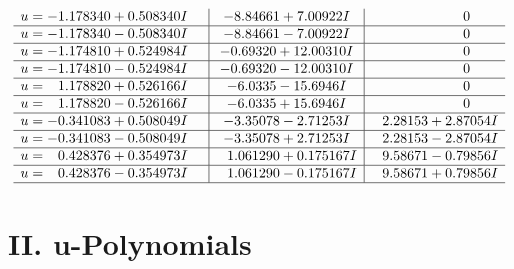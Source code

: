 \documentclass[1p]{elsarticle_modified}
\theoremstyle{definition}
\begin{document}
$$\begin{array}{c|c|c}
\begin{aligned}
u &= -1.178340 + 0.508340 I\end{aligned}
 & -8.84661 + 7.00922 I & \phantom{-0.000000 } 0 \\ \hline\begin{aligned}
u &= -1.178340 - 0.508340 I\end{aligned}
 & -8.84661 - 7.00922 I & \phantom{-0.000000 } 0 \\ \hline\begin{aligned}
u &= -1.174810 + 0.524984 I\end{aligned}
 & -0.69320 + 12.00310 I & \phantom{-0.000000 } 0 \\ \hline\begin{aligned}
u &= -1.174810 - 0.524984 I\end{aligned}
 & -0.69320 - 12.00310 I & \phantom{-0.000000 } 0 \\ \hline\begin{aligned}
u &= \phantom{-}1.178820 + 0.526166 I\end{aligned}
 & -6.0335 - 15.6946 I & \phantom{-0.000000 } 0 \\ \hline\begin{aligned}
u &= \phantom{-}1.178820 - 0.526166 I\end{aligned}
 & -6.0335 + 15.6946 I & \phantom{-0.000000 } 0 \\ \hline\begin{aligned}
u &= -0.341083 + 0.508049 I\end{aligned}
 & -3.35078 - 2.71253 I & \phantom{-}2.28153 + 2.87054 I \\ \hline\begin{aligned}
u &= -0.341083 - 0.508049 I\end{aligned}
 & -3.35078 + 2.71253 I & \phantom{-}2.28153 - 2.87054 I \\ \hline\begin{aligned}
u &= \phantom{-}0.428376 + 0.354973 I\end{aligned}
 & \phantom{-}1.061290 + 0.175167 I & \phantom{-}9.58671 - 0.79856 I \\ \hline\begin{aligned}
u &= \phantom{-}0.428376 - 0.354973 I\end{aligned}
 & \phantom{-}1.061290 - 0.175167 I & \phantom{-}9.58671 + 0.79856 I\\
 \hline 
 \end{array}$$\newpage
\newpage\renewcommand{\arraystretch}{1}
\centering \section*{ II. u-Polynomials}
\end{document}
